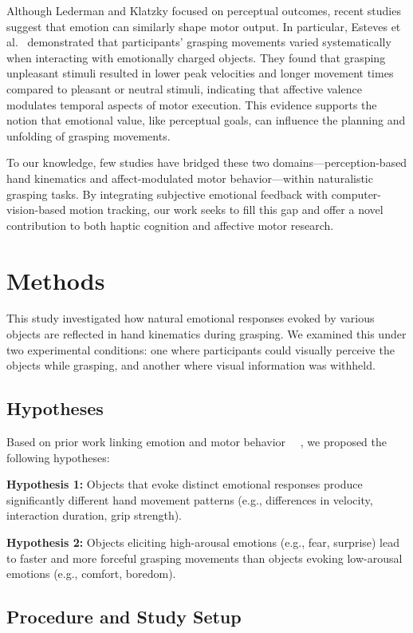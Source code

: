 \documentclass[conference]{IEEEtran}
\begin{document}
Although Lederman and Klatzky focused on perceptual outcomes, recent studies suggest that emotion can similarly shape motor output. In particular, Esteves et al.~\cite{b2} demonstrated that participants' grasping movements varied systematically when interacting with emotionally charged objects. They found that grasping unpleasant stimuli resulted in lower peak velocities and longer movement times compared to pleasant or neutral stimuli, indicating that affective valence modulates temporal aspects of motor execution. This evidence supports the notion that emotional value, like perceptual goals, can influence the planning and unfolding of grasping movements.

To our knowledge, few studies have bridged these two domains—perception-based hand kinematics and affect-modulated motor behavior—within naturalistic grasping tasks. By integrating subjective emotional feedback with computer-vision-based motion tracking, our work seeks to fill this gap and offer a novel contribution to both haptic cognition and affective motor research.

\section{Methods}
\label{sec:methods}

This study investigated how natural emotional responses evoked by various objects are reflected in hand kinematics during grasping. We examined this under two experimental conditions: one where participants could visually perceive the objects while grasping, and another where visual information was withheld.

\subsection{Hypotheses}

Based on prior work linking emotion and motor behavior ~\cite{b1}~\cite{b2}, we proposed the following hypotheses:

    \textbf{Hypothesis 1:} Objects that evoke distinct emotional responses produce significantly different hand movement patterns (e.g., differences in velocity, interaction duration, grip strength).
    
    \textbf{Hypothesis 2:} Objects eliciting high-arousal emotions (e.g., fear, surprise) lead to faster and more forceful grasping movements than objects evoking low-arousal emotions (e.g., comfort, boredom).

\subsection{Procedure and Study Setup}
\end{document}
